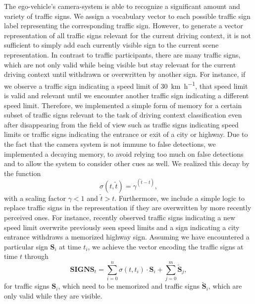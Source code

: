 The ego-vehicle's camera-system is able to recognize a significant amount and variety of traffic signs.
We assign a vocabulary vector to each possible traffic sign label representing the corresponding traffic sign.
However, to generate a vector representation of all traffic signs relevant for the current driving context, it is not sufficient to simply add each currently visible sign to the current scene representation.
In contrast to traffic participants, there are many traffic signs, which are not only valid while being visible but stay relevant for the current driving context until withdrawn or overwritten by another sign.
For instance, if we observe a traffic sign indicating a speed limit of \SI[per-mode=symbol]{30}{\kilo\meter\per\hour}, that speed limit is valid and relevant until we encounter another traffic sign indicating a different speed limit.
Therefore, we implemented a simple form of memory for a certain subset of traffic signs relevant to the task of driving context classification even after disappearing from the field of view such as traffic signs indicating speed limits or traffic signs indicating the entrance or exit of a city or highway.
Due to the fact that the camera system is not immune to false detections, we implemented a decaying memory, to avoid relying too much on false detections and to allow the system to consider other cues as well.
We realized this decay by the function 
\begin{equation}
\label{eq:context_class_decay}
\sigma(t, \tilde{t}) = \gamma^{(\tilde{t} - t)},
\end{equation}
with a scaling factor $\gamma < 1$ and $ \tilde{t} > t$.
Furthermore, we include a simple logic to replace traffic signs in the representation if they are overwritten by more recently perceived ones.
For instance, recently observed traffic signs indicating a new speed limit overwrite previously seen speed limits and a sign indicating a city entrance withdraws a memorized highway sign.
Assuming we have encountered a particular sign $\mathbf{S}_{i}$ at time $t_{i}$, we achieve the vector encoding the traffic signs at time $t$ through
\begin{equation}
\label{eq:traffic_sign_context_class}
\mathbf{SIGNS}_{t} = \sum\limits_{i=0}^{n} \sigma(t, t_{i}) \cdot \mathbf{S}_{i} + \sum\limits_{j=0}^{m} \mathbf{\tilde{S}}_{j},
\end{equation}
for traffic signs $ \mathbf{S}_{i}$, which need to be memorized and traffic signs $ \mathbf{ \tilde{S}}_{i}$, which are only valid while they are visible.

